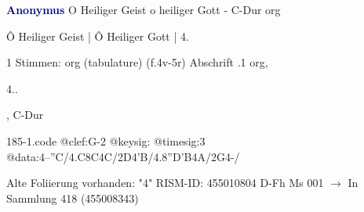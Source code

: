 \documentclass[twocolumn]{book}
\begin{document}
\newline \par \vspace{7pt} \textcolor{darkblue}{\textbf{Anonymus  }}
\newline O Heiliger Geist o heiliger Gott - C-Dur
\newline org
\newline \begin{itshape}[f.4v, at left:] Ô Heiliger Geist | Ô Heiliger Gott | 4.\end{itshape} 
\newline \textcolor{darkblue}{}  1 Stimmen: org (tabulature)  (f.4v-5r)
\newline Abschrift
.1  org, \begin{itshape}4..\end{itshape}, C-Dur  
\begin{filecontents*}{185-1.code}
@clef:G-2
@keysig:
@timesig:3
@data:4--''C/4.C8C4C/2D4'B/4.8''D'B4A/2G4-/
\end{filecontents*}
\newline
%
\newline Alte Foliierung vorhanden: "4"
\newline RISM-ID: 455010804
\newline D-Fh  Ms 001
\newline $\rightarrow$ In Sammlung 418 (455008343)
      
\end{document}
